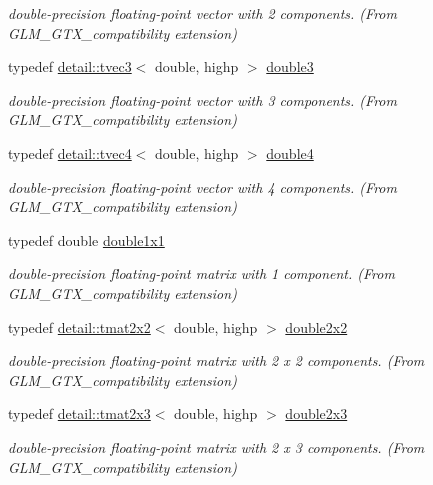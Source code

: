 \begin{DoxyCompactItemize}
\begin{DoxyCompactList}\small\item\em double-\/precision floating-\/point vector with 2 components. (From G\+L\+M\+\_\+\+G\+T\+X\+\_\+compatibility extension) \end{DoxyCompactList}\item 
typedef \hyperlink{structglm_1_1detail_1_1tvec3}{detail\+::tvec3}$<$ double, highp $>$ \hyperlink{group__gtx__compatibility_ga3b94d4a19ca0272cad6e025fc5150d06}{double3}
\begin{DoxyCompactList}\small\item\em double-\/precision floating-\/point vector with 3 components. (From G\+L\+M\+\_\+\+G\+T\+X\+\_\+compatibility extension) \end{DoxyCompactList}\item 
typedef \hyperlink{structglm_1_1detail_1_1tvec4}{detail\+::tvec4}$<$ double, highp $>$ \hyperlink{group__gtx__compatibility_ga1edf736b418528a2fc87d826f7697b9d}{double4}
\begin{DoxyCompactList}\small\item\em double-\/precision floating-\/point vector with 4 components. (From G\+L\+M\+\_\+\+G\+T\+X\+\_\+compatibility extension) \end{DoxyCompactList}\item 
typedef double \hyperlink{group__gtx__compatibility_ga1c87d3042377335eb050a20ab0ec148a}{double1x1}
\begin{DoxyCompactList}\small\item\em double-\/precision floating-\/point matrix with 1 component. (From G\+L\+M\+\_\+\+G\+T\+X\+\_\+compatibility extension) \end{DoxyCompactList}\item 
typedef \hyperlink{structglm_1_1detail_1_1tmat2x2}{detail\+::tmat2x2}$<$ double, highp $>$ \hyperlink{group__gtx__compatibility_ga75cfac00b48c51f4b677151f789b8547}{double2x2}
\begin{DoxyCompactList}\small\item\em double-\/precision floating-\/point matrix with 2 x 2 components. (From G\+L\+M\+\_\+\+G\+T\+X\+\_\+compatibility extension) \end{DoxyCompactList}\item 
typedef \hyperlink{structglm_1_1detail_1_1tmat2x3}{detail\+::tmat2x3}$<$ double, highp $>$ \hyperlink{group__gtx__compatibility_gac267cd849a60e6e96350aa5fd665d5ef}{double2x3}
\begin{DoxyCompactList}\small\item\em double-\/precision floating-\/point matrix with 2 x 3 components. (From G\+L\+M\+\_\+\+G\+T\+X\+\_\+compatibility extension) \end{DoxyCompactList}\item 

\end{DoxyCompactItemize}
